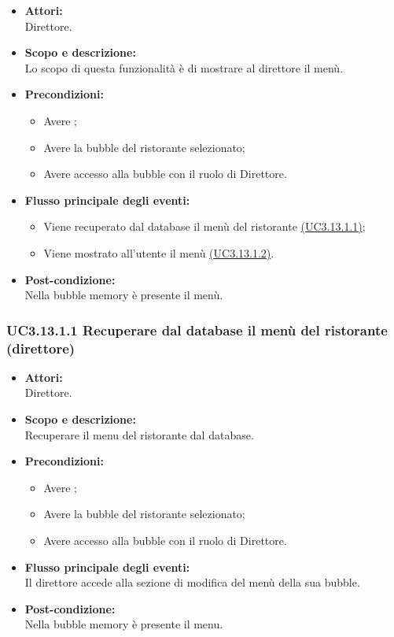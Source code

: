 \begin{itemize}
	\item \textbf{Attori:}
	\\Direttore.
	\item \textbf{Scopo e descrizione:} 
	\\Lo scopo di questa funzionalità è di mostrare al direttore il menù.
	\item \textbf{Precondizioni:}
	\begin{itemize}
		\item Avere ;
		\item Avere la bubble del ristorante selezionato;
		\item Avere accesso alla bubble con il ruolo di Direttore.
	\end{itemize}
	\item \textbf{Flusso principale degli eventi:}
	\begin{itemize}
		\item Viene recuperato dal database il menù del ristorante \hyperref[UC3.13.1.1]{(UC3.13.1.1)};
		\item Viene mostrato all’utente il menù \hyperref[UC3.13.1.2]{(UC3.13.1.2)}.
	\end{itemize}
	\item \textbf{Post-condizione:}
	\\Nella bubble memory è presente il menù.
\end{itemize}

\subsubsection{UC3.13.1.1 Recuperare dal database il menù del ristorante (direttore)} \label{UC3.13.1.1}

\begin{itemize}
	\item \textbf{Attori:}
	\\Direttore.
	\item \textbf{Scopo e descrizione:} 
	\\Recuperare il menu del ristorante dal database.
	\item \textbf{Precondizioni:}
	\begin{itemize}
		\item Avere ;
		\item Avere la bubble del ristorante selezionato;
		\item Avere accesso alla bubble con il ruolo di Direttore.
	\end{itemize}
	\item \textbf{Flusso principale degli eventi:}
	\\Il direttore accede alla sezione di modifica del menù della sua bubble.
	\item \textbf{Post-condizione:}
	\\Nella bubble memory è presente il menu.
\end{itemize}

